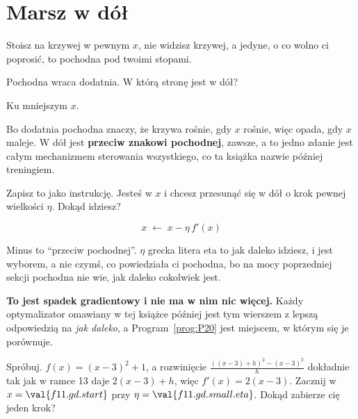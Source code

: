 \section{Marsz w dół}
\label{sec:F11-downhill}

\begin{fr}
Stoisz na krzywej w pewnym $x$, nie widzisz krzywej, a jedyne, o co wolno ci
poprosić, to pochodna pod twoimi stopami.

Pochodna wraca dodatnia. W którą stronę jest w dół?
\nextframe
\end{fr}

\begin{fr}
\begin{ansblock}
Ku mniejszym $x$.
\end{ansblock}

Bo dodatnia pochodna znaczy, że krzywa rośnie, gdy $x$ rośnie, więc opada, gdy
$x$ maleje. W dół jest \textbf{przeciw znakowi pochodnej}, zawsze, a to jedno
zdanie jest całym mechanizmem sterowania wszystkiego, co ta książka nazwie
później treningiem.

Zapisz to jako instrukcję. Jesteś w $x$ i chcesz przesunąć się w dół o krok
pewnej wielkości $\eta$. Dokąd idziesz?
\nextframe
\end{fr}

\begin{fr}
\begin{ansblock}
\[ x \;\longleftarrow\; x - \eta\, f'(x) \]
\end{ansblock}

Minus to \enquote{przeciw pochodnej}. $\eta$ \dash{} grecka litera eta \dash{}
to jak daleko idziesz, i jest wyborem, a nie czymś, co powiedziała ci
pochodna, bo na mocy poprzedniej sekcji pochodna nie wie, jak daleko cokolwiek
jest.

\textbf{To jest spadek gradientowy i nie ma w nim nic więcej.} Każdy
optymalizator omawiany w tej książce później jest tym wierszem z lepszą
odpowiedzią na \emph{jak daleko}, a Program~\ref{prog:P20} jest miejscem, w
którym się je porównuje.

Spróbuj. $f(x) = (x-3)^{2} + 1$, a rozwinięcie
$\frac{((x-3)+h)^{2} - (x-3)^{2}}{h}$ dokładnie tak jak w ramce 13 daje
$2(x-3) + h$, więc $f'(x) = 2(x-3)$. Zacznij w
$x = \val{f11.gd.start}$ przy $\eta = \val{f11.gd.small.eta}$. Dokąd zabierze
cię jeden krok?
\nextframe
\end{fr}

